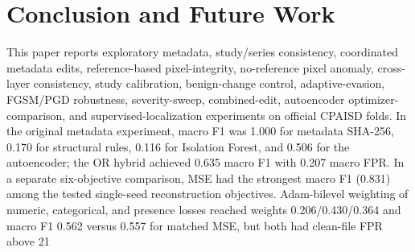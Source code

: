 \documentclass[journal]{IEEEtran}
\begin{document}
  \section{Conclusion and Future Work}
  This paper reports exploratory metadata, study/series consistency, coordinated metadata edits, reference-based pixel-integrity, no-reference pixel anomaly, cross-layer consistency, study calibration, benign-change control, adaptive-evasion, FGSM/PGD robustness, severity-sweep, combined-edit, autoencoder optimizer-comparison, and supervised-localization experiments on official CPAISD folds. In the original metadata experiment, macro F1 was 1.000 for metadata SHA-256, 0.170 for structural rules, 0.116 for Isolation Forest, and 0.506 for the autoencoder; the OR hybrid achieved 0.635 macro F1 with 0.207 macro FPR. In a separate six-objective comparison, MSE had the strongest macro F1 (0.831) among the tested single-seed reconstruction objectives. Adam-bilevel weighting of numeric, categorical, and presence losses reached weights 0.206/0.430/0.364 and macro F1 0.562 versus 0.557 for matched MSE, but both had clean-file FPR above 21%
\end{document}
